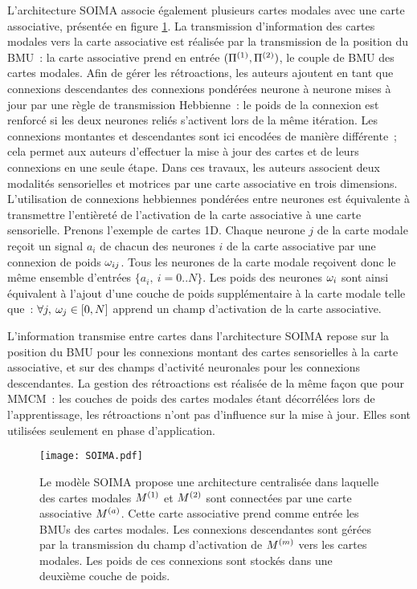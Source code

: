 \documentclass[../main]{subfiles}
\begin{document}
L'architecture SOIMA \parencite{escobar-juarez_self-organized_2016} associe également plusieurs cartes modales avec une carte associative, présentée en figure \ref{fig:SOIMA}.
La transmission d'information des cartes modales vers la carte associative est réalisée par la transmission de la position du BMU~: la carte associative prend en entrée $(\Pi^{({1})},\Pi^{({2})})$, le couple de BMU des cartes modales. 
Afin de gérer les rétroactions, les auteurs ajoutent en tant que connexions descendantes des connexions pondérées neurone à neurone mises à jour par une règle de transmission Hebbienne~: le poids de la connexion est renforcé si les deux neurones reliés s'activent lors de la même itération.
Les connexions montantes et descendantes sont ici encodées de manière différente~; cela permet aux auteurs d'effectuer la mise à jour des cartes et de leurs connexions en une seule étape. 
Dans ces travaux, les auteurs associent deux modalités sensorielles et motrices par une carte associative en trois dimensions.
L'utilisation de connexions hebbiennes pondérées entre neurones est équivalente à transmettre l'entièreté de l'activation de la carte associative à une carte sensorielle.
Prenons l'exemple de cartes 1D. Chaque neurone $j$ de la carte modale reçoit un signal $a_{i}$ de chacun des neurones $i$ de la carte associative par une connexion de poids $\omega_{ij}$. Tous les neurones de la carte modale reçoivent donc le même ensemble d'entrées $ \{a_{i},\: i = 0 .. N\}$.
Les poids des neurones $\omega_i$ sont ainsi équivalent à l'ajout d'une couche de poids supplémentaire à la carte modale telle que~: $\forall j, \: \omega_j \in [0,N]$ apprend un champ d'activation de la carte associative.

L'information transmise entre cartes dans l'architecture SOIMA repose sur la position du BMU pour les connexions montant des cartes sensorielles à la carte associative, et sur des champs d'activité neuronales pour les connexions descendantes.
La gestion des rétroactions est réalisée de la même façon que pour MMCM~: les couches de poids des cartes modales étant décorrélées lors de l'apprentissage, les rétroactions n'ont pas d'influence sur la mise à jour. Elles sont utilisées seulement en phase d'application.

\begin{figure}[t]
    \centering
    \texttt{[image: SOIMA.pdf]}
    \caption{Le modèle SOIMA \parencite{escobar-juarez_self-organized_2016} propose une architecture centralisée dans laquelle des cartes modales $M^{({1})}$ et $M^{({2})}$ sont connectées par une carte associative $M^{({a})}$. Cette carte associative prend comme entrée les BMUs des cartes modales. 
    Les connexions descendantes sont gérées par la transmission du champ d'activation de $M^{({m})}$ vers les cartes modales. Les poids de ces connexions sont stockés dans une deuxième couche de poids.
    \label{fig:SOIMA}}
\end{figure}
\end{document}
